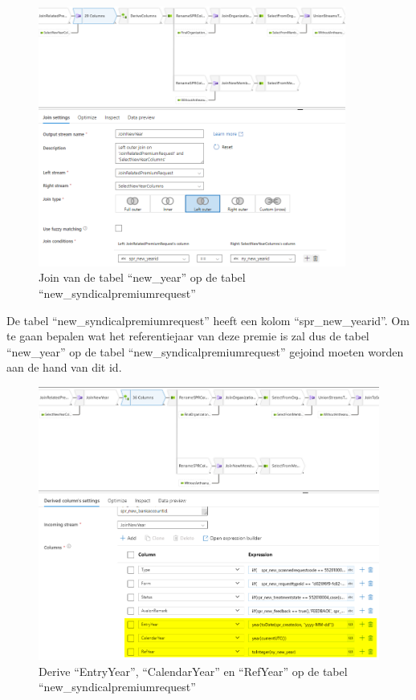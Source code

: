 \begin{figure}[H]
    \centering
    \includegraphics[width=0.9\textwidth]{./graphics/adf/bepalen_groep_1.png}
    \caption{Join van de tabel ``new\_year'' op de tabel ``new\_syndicalpremiumrequest''}
\end{figure}

De tabel ``new\_syndicalpremiumrequest'' heeft een kolom ``spr\_new\_yearid''. Om te gaan bepalen wat het referentiejaar van deze premie is zal dus de tabel ``new\_year'' op de tabel ``new\_syndicalpremiumrequest'' gejoind moeten worden aan de hand van dit id.


\begin{figure}[H]
    \centering
    \includegraphics[width=1\textwidth]{./graphics/adf/bepalen_groep_2.png}
    \caption{Derive ``EntryYear'', ``CalendarYear'' en ``RefYear'' op de tabel ``new\_syndicalpremiumrequest''}
\end{figure}


